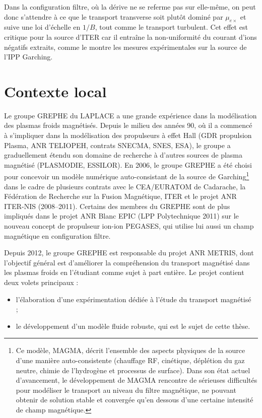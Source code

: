 \begin{refsection}
Dans la configuration filtre, où la dérive ne se referme pas sur elle-même, on
peut donc s'attendre à ce que le transport transverse soit plutôt dominé par $\mu_{e\times}$ et suive une loi d'échelle en $1/B$, tout comme le transport
turbulent. Cet effet est critique pour la source d'ITER car il
entraîne la non-uniformité du courant d'ions négatifs extraits, comme le montre
les mesures expérimentales sur la source de l'IPP Garching.

 \section*{Contexte local} Le
groupe GREPHE du LAPLACE a une grande expérience dans la modélisation des plasmas froids magnétisés. Depuis le milieu des années 90, où il a commencé à s'impliquer dans la modélisation des propulseurs à effet Hall (GDR propulsion Plasma, ANR TELIOPEH, contrats SNECMA, SNES, ESA), le groupe a graduellement
étendu son domaine de recherche à d'autres sources de plasma magnétisé
(PLASMODIE, ESSILOR). En 2006, le groupe GREPHE
a été choisi pour concevoir un modèle numérique auto-consistant de la source de
Garching\footnote{Ce modèle, MAGMA, décrit l'ensemble des aspects
physiques de la source d'une manière auto-consistente (chauffage RF, cinétique,
déplétion du gaz neutre, chimie de l'hydrogène et processus de surface). Dans
son état actuel d'avancement, le développement de MAGMA rencontre de sérieuses
difficultés pour modéliser le transport au niveau du filtre magnétique, ne
pouvant obtenir de solution stable et convergée qu'en dessous d'une certaine
intensité de champ magnétique.} dans le cadre de plusieurs contrats avec le CEA/EURATOM de
Cadarache, la Fédération de Recherche sur la Fusion Magnétique, ITER et le
projet ANR ITER-NIS (2008--2011). Certains des membres du GREPHE sont de plus
impliqués dans le projet ANR Blanc EPIC (LPP Polytechnique 2011) sur le nouveau
concept de propulseur ion-ion PEGASES, qui utilise lui aussi un
champ magnétique en configuration filtre. 

Depuis 2012, le groupe GREPHE est responsable du projet ANR METRIS, dont
l'objectif général est d'améliorer la compréhension du transport magnétisé dans
les plasmas froids en l'étudiant comme sujet à part entière. Le projet
contient deux volets principaux :

\begin{itemize}
  \item l'élaboration d'une expérimentation dédiée à l'étude du transport
magnétisé~\parencite{Baude} ;
\item le développement d'un modèle fluide robuste, qui est
le sujet de cette thèse.
\end{itemize}
 

\end{refsection}
